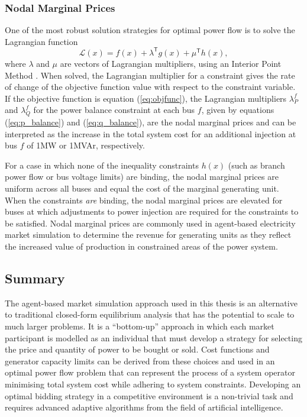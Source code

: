 \subsubsection{Nodal Marginal Prices}
One of the most robust solution strategies for optimal power flow is to solve
the Lagrangian function
\begin{equation}
\mathcal{L}(x) = f(x) + \lambda^\mathsf{T}g(x) + \mu^\mathsf{T}h(x),
\end{equation}
where $\lambda$ and $\mu$ are vectors of Lagrangian multipliers, using an
Interior Point Method \cite{cvxopt:2004,zimmerman:ccv}.  When solved, the Lagrangian
multiplier for a constraint gives the rate of change of the objective function
value with respect to the constraint variable.  If the objective function is
equation (\ref{eq:objfunc}), the Lagrangian multipliers $\lambda^f_P$ and
$\lambda^f_Q$ for the power balance constraint at each bus $f$, given by
equations (\ref{eq:p_balance}) and (\ref{eq:q_balance}), are the nodal marginal
prices and can be interpreted as the increase in the total system cost for an
additional injection at bus $f$ of 1MW or 1MVAr, respectively.

For a case in which none of the inequality constraints $h(x)$
(such as branch power flow or bus voltage limits) are binding, the nodal
marginal prices are uniform across all buses and equal the cost of the
marginal generating unit.  When the constraints \textit{are} binding, the nodal
marginal prices are elevated for buses at which adjustments to power injection
are required for the constraints to be satisfied.  Nodal marginal prices are
commonly used in agent-based electricity market simulation to determine the
revenue for generating units as they reflect the increased value of production
in constrained areas of the power system.

\subsection{Summary}
The agent-based market simulation approach used in this thesis is an alternative
to traditional closed-form equilibrium analysis that has the potential to scale
to much larger problems. It is a ``bottom-up'' approach in which each market
participant is modelled as an individual that must develop a strategy for
selecting the price and quantity of power to be bought or sold.  Cost functions
and generator capacity limits can be derived from these choices and used in an
optimal power flow problem that can represent the process of a system operator
minimising total system cost while adhering to system constraints.
Developing an optimal bidding strategy in a competitive environment is a
non-trivial task and requires advanced adaptive algorithms from the field of
artificial intelligence.

